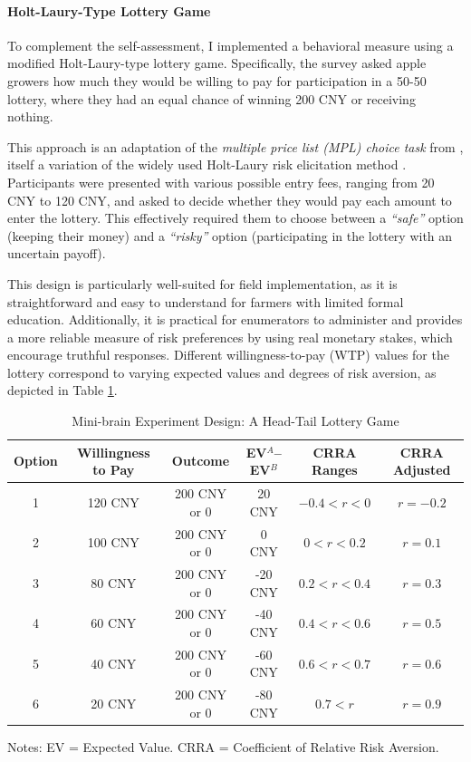 \documentclass[12pt]{article}
\begin{document}
\paragraph{Holt-Laury-Type Lottery Game}
To complement the self-assessment, I implemented a behavioral measure using a modified Holt-Laury-type lottery game. Specifically, the survey asked apple growers how much they would be willing to pay for participation in a 50-50 lottery, where they had an equal chance of winning 200 CNY or receiving nothing. 

This approach is an adaptation of the \textit{multiple price list (MPL) choice task} from \cite{brick2012risk}, itself a variation of the widely used Holt-Laury risk elicitation method \cite{holt2002risk}. Participants were presented with various possible entry fees, ranging from 20 CNY to 120 CNY, and asked to decide whether they would pay each amount to enter the lottery. This effectively required them to choose between a \textit{``safe''} option (keeping their money) and a \textit{``risky''} option (participating in the lottery with an uncertain payoff). 

This design is particularly well-suited for field implementation, as it is straightforward and easy to understand for farmers with limited formal education. Additionally, it is practical for enumerators to administer and provides a more reliable measure of risk preferences by using real monetary stakes, which encourage truthful responses. Different willingness-to-pay (WTP) values for the lottery correspond to varying expected values and degrees of risk aversion, as depicted in Table \ref{tab:experiment_design}.

\begin{table}[H]
    \centering
    \footnotesize 
    \caption{Mini-brain Experiment Design: A Head-Tail Lottery Game}
    \renewcommand{\arraystretch}{1.2}
    \begin{tabular}{cccccc}
        \toprule
        \textbf{Option} & \textbf{Willingness to Pay} & \textbf{Outcome} & \textbf{EV$^{A}$--EV$^{B}$} & \textbf{CRRA Ranges} & \textbf{CRRA Adjusted}\\
        \midrule
        1 & 120 CNY & 200 CNY or 0 & 20 CNY & $-0.4 < r < 0$  & $r = -0.2$\\
        2 & 100 CNY & 200 CNY or 0 & 0 CNY & $0 < r < 0.2$  & $r= 0.1$ \\
        3 & 80 CNY & 200 CNY or 0 & -20 CNY & $0.2 < r < 0.4$  & $r= 0.3$ \\
        4 & 60 CNY & 200 CNY or 0 & -40 CNY & $0.4 < r < 0.6$  & $r= 0.5$ \\
        5 & 40 CNY & 200 CNY or 0 & -60 CNY & $0.6 < r < 0.7$  & $r=0.6$ \\
        6 & 20 CNY & 200 CNY or 0 & -80 CNY & $0.7 < r$  & $r= 0.9$ \\
        \bottomrule
    \end{tabular}
    \label{tab:experiment_design}
    \vspace{0.5em}
    \small Notes: EV = Expected Value. CRRA = Coefficient of Relative Risk Aversion.
\end{table}
\end{document}
